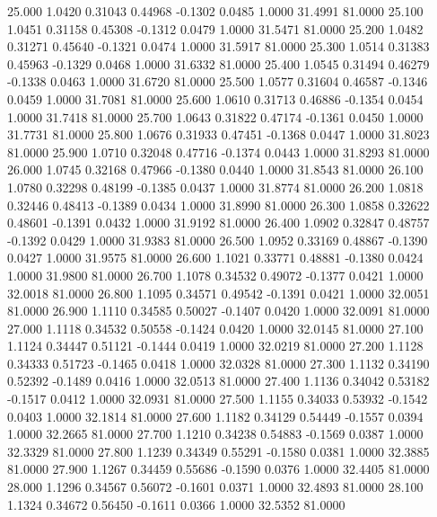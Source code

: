   25.000   1.0420   0.31043   0.44968  -0.1302   0.0485   1.0000  31.4991  81.0000
  25.100   1.0451   0.31158   0.45308  -0.1312   0.0479   1.0000  31.5471  81.0000
  25.200   1.0482   0.31271   0.45640  -0.1321   0.0474   1.0000  31.5917  81.0000
  25.300   1.0514   0.31383   0.45963  -0.1329   0.0468   1.0000  31.6332  81.0000
  25.400   1.0545   0.31494   0.46279  -0.1338   0.0463   1.0000  31.6720  81.0000
  25.500   1.0577   0.31604   0.46587  -0.1346   0.0459   1.0000  31.7081  81.0000
  25.600   1.0610   0.31713   0.46886  -0.1354   0.0454   1.0000  31.7418  81.0000
  25.700   1.0643   0.31822   0.47174  -0.1361   0.0450   1.0000  31.7731  81.0000
  25.800   1.0676   0.31933   0.47451  -0.1368   0.0447   1.0000  31.8023  81.0000
  25.900   1.0710   0.32048   0.47716  -0.1374   0.0443   1.0000  31.8293  81.0000
  26.000   1.0745   0.32168   0.47966  -0.1380   0.0440   1.0000  31.8543  81.0000
  26.100   1.0780   0.32298   0.48199  -0.1385   0.0437   1.0000  31.8774  81.0000
  26.200   1.0818   0.32446   0.48413  -0.1389   0.0434   1.0000  31.8990  81.0000
  26.300   1.0858   0.32622   0.48601  -0.1391   0.0432   1.0000  31.9192  81.0000
  26.400   1.0902   0.32847   0.48757  -0.1392   0.0429   1.0000  31.9383  81.0000
  26.500   1.0952   0.33169   0.48867  -0.1390   0.0427   1.0000  31.9575  81.0000
  26.600   1.1021   0.33771   0.48881  -0.1380   0.0424   1.0000  31.9800  81.0000
  26.700   1.1078   0.34532   0.49072  -0.1377   0.0421   1.0000  32.0018  81.0000
  26.800   1.1095   0.34571   0.49542  -0.1391   0.0421   1.0000  32.0051  81.0000
  26.900   1.1110   0.34585   0.50027  -0.1407   0.0420   1.0000  32.0091  81.0000
  27.000   1.1118   0.34532   0.50558  -0.1424   0.0420   1.0000  32.0145  81.0000
  27.100   1.1124   0.34447   0.51121  -0.1444   0.0419   1.0000  32.0219  81.0000
  27.200   1.1128   0.34333   0.51723  -0.1465   0.0418   1.0000  32.0328  81.0000
  27.300   1.1132   0.34190   0.52392  -0.1489   0.0416   1.0000  32.0513  81.0000
  27.400   1.1136   0.34042   0.53182  -0.1517   0.0412   1.0000  32.0931  81.0000
  27.500   1.1155   0.34033   0.53932  -0.1542   0.0403   1.0000  32.1814  81.0000
  27.600   1.1182   0.34129   0.54449  -0.1557   0.0394   1.0000  32.2665  81.0000
  27.700   1.1210   0.34238   0.54883  -0.1569   0.0387   1.0000  32.3329  81.0000
  27.800   1.1239   0.34349   0.55291  -0.1580   0.0381   1.0000  32.3885  81.0000
  27.900   1.1267   0.34459   0.55686  -0.1590   0.0376   1.0000  32.4405  81.0000
  28.000   1.1296   0.34567   0.56072  -0.1601   0.0371   1.0000  32.4893  81.0000
  28.100   1.1324   0.34672   0.56450  -0.1611   0.0366   1.0000  32.5352  81.0000

